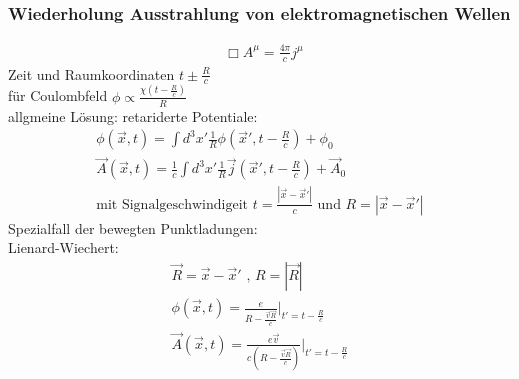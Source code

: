 \documentclass[a4paper]{article}
\newcommand*\dalembert{\mathop{}\!\mathbin\Box}
\begin{document}
\subsubsection{Wiederholung Ausstrahlung von elektromagnetischen Wellen}
\begin{align}
\dalembert A^\mu=\frac{4\pi}{c}j^\mu
\end{align}
Zeit und Raumkoordinaten $t\pm\frac{R}{c}$\\
für Coulombfeld $\phi\propto\frac{\chi(t-\frac{R}{c})}{R}$\\
allgmeine Lösung: retariderte Potentiale:\\
\begin{align}
\phi(\vec{x},t)=\int d^3x' \frac{1}{R}\phi(\vec{x}',t-\frac{R}{c})+\phi_0\\
\vec{A}(\vec{x},t)=\frac{1}{c}\int d^3x'
\frac{1}{R}\vec{j}(\vec{x}',t-\frac{R}{c})+\vec{A}_0\\
\text{mit Signalgeschwindigeit }t=\frac{|\vec{x}-\vec{x}'|}{c} \text{ und }
R=|\vec{x}-\vec{x}'|
\end{align}
Spezialfall der bewegten Punktladungen:\\
Lienard-Wiechert:
\begin{align}
\vec{R}=\vec{x}-\vec{x}' \text{ , } R=|\vec{R}|\\
\phi(\vec{x},t)=\frac{e}{R-\frac{\vec{v}\vec{R}}{c}}|_{t'=t-\frac{R}{c}}\\
\vec{A}(\vec{x},t)=\frac{e\vec{v}}{c(R-\frac{\vec{v}\vec{R}}{c})}|_{t'=t-\frac{R}{c}}
\end{align}
\end{document}

